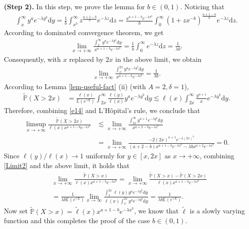 \documentclass[10pt,a4paper]{amsart}
\numberwithin{equation}{section}
\begin{document}
\noindent
{\bf (Step 2).} In this step, we prove the lemma for $b\in (0,1)$. Noticing that 
\begin{align}
	\int_x^\infty y^a e^{-\lambda y^b}\mathrm{d} y =  \frac{1}{b}\int_{x^b}^\infty z^{\frac{a+1-b}{b}} e^{-\lambda z}\mathrm{d}z = \frac{x^{a+1-b}e^{-\lambda x^b}}{b}\int_{0}^\infty (1+zx^{-b})^{\frac{a+1-b}{b}} e^{-\lambda z}\mathrm{d}z .
\end{align}
According to dominated convergence theorem,  we get
\begin{align}
	\lim_{x\to+\infty} \frac{\int_x^\infty y^a e^{-\lambda y^b}\mathrm{d} y }{x^{a+1-b}e^{-\lambda x^b}}= \frac{1}{b}\int_0^\infty e^{-\lambda z}\mathrm{d}z = \frac{1}{\lambda b}.
\end{align}
Consequently, with $x$ replaced by $2x$ in the above limit, we obtain 
\begin{align}\label{Limit2}
			\lim_{x\to+\infty} \frac{\int_x^{2x} y^a e^{-\lambda y^b}\mathrm{d} y }{x^{a+1-b}e^{-\lambda x^b}} = \frac{1}{\lambda b}.
\end{align}
According to Lemma \ref{lem-useful-fact} (ii) (with $A=2, \delta=1$), 
\begin{align}\label{e14}
		\widetilde{\mathbb{P}}(X>2x) & =\frac{\ell(x)}{\mathbb{E}(e^{\gamma X})}  \int_{2x}^\infty \frac{\ell(y)}{\ell(x)}y^a e^{-\lambda y^b}\mathrm{d}y\lesssim \ell(x)  \int_{2x}^\infty \frac{y^{a+1}}{x} e^{-\lambda y^b}\mathrm{d}y.
\end{align}
Therefore,  combining  \eqref{e14} and L'H\^opital's rule, we conclude that 
 \begin{align}
 	\limsup_{x\to+\infty} \frac{\widetilde{\mathbb{P}}(X>2x) }{\ell(x) x^{a+1-b} e^{-\lambda x^b}} & \lesssim \lim_{x\to+\infty}\frac{\int_{2x}^\infty y^{a+1} e^{-\lambda y^b}\mathrm{d}y}{x^{a+2-b} e^{-\lambda x^b}} \nonumber\\
 	& = \lim_{x\to+\infty}\frac{-2 (2x)^{a+1} e^{-\lambda (2x)^b} }{ (a+2-b)x^{a+1-b} e^{-\lambda x^b} - \lambda bx^{a+2}e^{-\lambda x^b}} =0.
 \end{align}
 Since $\ell(y)/\ell(x)\to 1$ uniformly for $y\in [x,2x]$ as $x\to+\infty$, combining \eqref{Limit2} and the above limit, it holds that 
 \begin{align}
 		 & \lim_{x\to+\infty} \frac{\widetilde{\mathbb{P}}(X>x) }{\ell(x) x^{a+1-b} e^{-\lambda x^b}}  = 	\lim_{x\to+\infty} \frac{\widetilde{\mathbb{P}}(X>x) - \widetilde{\mathbb{P}}(X>2x) }{\ell(x) x^{a+1-b} e^{-\lambda x^b}}\nonumber\\
 		&= \frac{1}{ \lambda b \mathbb{E}(e^{\gamma X})}\lim_{x\to \infty} \frac{ \int_x^{2x} \ell(y) y^a e^{-\lambda y^b}\mathrm{d}y}{\ell(x) \int_x^{2x} y^a e^{-\lambda y^b}\mathrm{d} y}  =  \frac{1}{ \lambda b \mathbb{E}(e^{\gamma X})}.
 \end{align}
 Now set $\widetilde{\mathbb P}(X>x)= \widetilde{\ell}(x) x^{a+1-b} e^{-\lambda x^b}$, we know that $\widetilde{\ell}$ is a slowly varying function and this completes the proof of the case $b\in (0,1)$.
 
\end{document}
